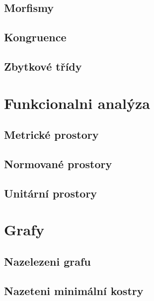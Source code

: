 \documentclass[12pt,a4paper,notitlepage,final]{article}
\begin{document}
\subsection{Morfismy}                         
\subsection{Kongruence}                       
\subsection{Zbytkové třídy}                   

\section{Funkcionalni analýza}
\subsection{Metrické prostory}               	
\subsection{Normované prostory}              	
\subsection{Unitární prostory}               	

\section{Grafy}
\subsection{Nazelezeni grafu}                	
\subsection{Nazeteni minimální kostry} 				

\end{document}
